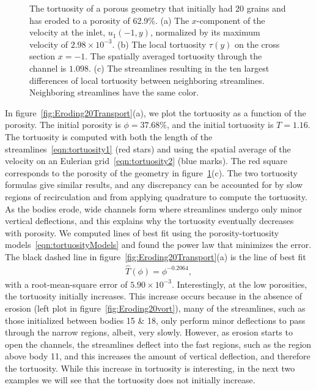 \documentclass{jfm}
\begin{document}
\begin{figure}
\begin{subfigure}[b]{0.5\textwidth}
\caption{}
\end{subfigure}
\caption{\label{fig:Eroding20tort} The tortuosity of a porous geometry
that initially had 20 grains and has eroded to a porosity of 62.9\%.
(a) The $x$-component of the velocity at the inlet, $u_1(-1,y)$,
normalized by its maximum velocity of $2.98 \times 10^{-3}$. (b) The
local tortuosity $\tau(y)$ on the cross section $x = -1$.  The spatially
averaged tortuosity through the channel is $1.098$.  (c) The streamlines
resulting in the ten largest differences of local tortuosity between
neighboring streamlines.  Neighboring streamlines have the same color.}
\end{figure}

In figure~\ref{fig:Eroding20Transport}(a), we plot the tortuosity as a
function of the porosity. The initial porosity is $\phi = 37.68\%$, and
the initial tortuosity is $T = 1.16$.  The tortuosity is computed with
both the length of the streamlines~\eqref{eqn:tortuosity1} (red stars)
and using the spatial average of the velocity on an Eulerian
grid~\eqref{eqn:tortuosity2} (blue marks).  The red square corresponds
to the porosity of the geometry in figure~\ref{fig:Eroding20tort}(c).
The two tortuosity formulas give similar results, and any discrepancy
can be accounted for by slow regions of recirculation and from applying
quadrature to compute the tortuosity.  As the bodies erode, wide
channels form where streamlines undergo only minor vertical deflections,
and this explains why the tortuosity eventually decreases with porosity.
We computed lines of best fit using the porosity-tortuosity
models~\eqref{eqn:tortuosityModels} and found the power law that
minimizes the error.  The  black dashed line in
figure~\ref{fig:Eroding20Transport}(a) is the line of best fit
\begin{align}
  \widehat{T}(\phi) = \phi^{-0.2064},
\end{align}
with a root-mean-square error of $5.90 \times 10^{-3}$.  Interestingly,
at the low porosities, the tortuosity initially increases. This increase
occurs because in the absence of erosion (left plot in
figure~\ref{fig:Eroding20vort}), many of the streamlines, such as those
initialized between bodies 15 \& 18, only perform minor deflections to
pass through the narrow regions, albeit, very slowly.  However, as
erosion starts to open the channels, the streamlines deflect into the
fast regions, such as the region above body 11, and this increases the
amount of vertical deflection, and therefore the tortuosity. While this
increase in tortuosity is interesting, in the next two examples we will
see that the tortuosity does not initially increase.
\end{document}
